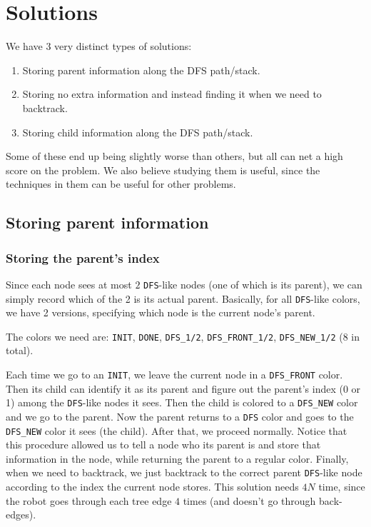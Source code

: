 \documentclass{article}
\begin{document}
\section{Solutions}

We have 3 very distinct types of solutions:

\begin{enumerate}
\item Storing parent information along the DFS path/stack.
\item Storing no extra information and instead finding it when we need to backtrack.
\item Storing child information along the DFS path/stack.
\end{enumerate}

Some of these end up being slightly worse than others, but all can net a high score on the problem. We also believe studying them is useful, since the techniques in them can be useful for other problems.

\subsection{Storing parent information}

\subsubsection{Storing the parent's index}

Since each node sees at most $2$ \verb|DFS|-like nodes (one of which is its parent), we can simply record which of the 2 is its actual parent. Basically, for all \verb|DFS|-like colors, we have 2 versions, specifying which node is the current node's parent.

The colors we need are: \verb|INIT|, \verb|DONE|, \verb|DFS_1/2|, \verb|DFS_FRONT_1/2|, \verb|DFS_NEW_1/2| (8 in total).

Each time we go to an \verb|INIT|, we leave the current node in a \verb|DFS_FRONT| color. Then its child can identify it as its parent and figure out the parent's index (0 or 1) among the \verb|DFS|-like nodes it sees. Then the child is colored to a \verb|DFS_NEW| color and we go to the parent. Now the parent returns to a \verb|DFS| color and goes to the \verb|DFS_NEW| color it sees (the child). After that, we proceed normally. Notice that this procedure allowed us to tell a node who its parent is and store that information in the node, while returning the parent to a regular color. Finally, when we need to backtrack, we just backtrack to the correct parent \verb|DFS|-like node according to the index the current node stores. This solution needs $4N$ time, since the robot goes through each tree edge $4$ times (and doesn't go through back-edges).
\end{document}
